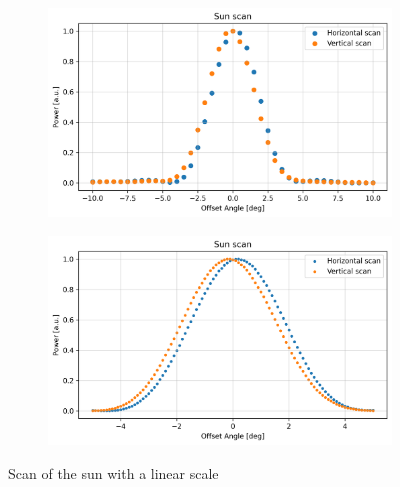 \begin{figure}[H]
    \centering
    \begin{subfigure}[t]{0.45\linewidth}
        \includegraphics[width=\linewidth]{assets/sun_scan_low_res.png}
    \end{subfigure}
    \begin{subfigure}[t]{0.45\linewidth}
        \includegraphics[width=\linewidth]{assets/sun_scan_high_res.png}
    \end{subfigure}
    \caption{Scan of the sun with a linear scale}
    \label{fig:sun_scan}
\end{figure}

